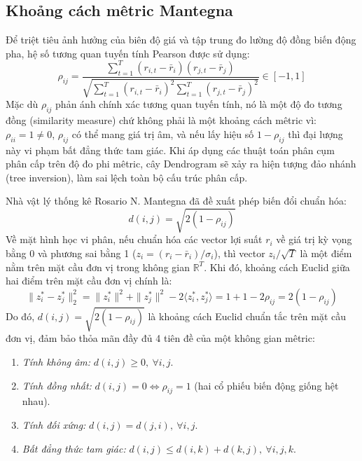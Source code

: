 \documentclass[12pt,a4paper,oneside,openany]{report}
\begin{document}
\subsection{Khoảng cách mêtric Mantegna}
Để triệt tiêu ảnh hưởng của biên độ giá và tập trung đo lường độ đồng biến động pha, hệ số tương quan tuyến tính Pearson được sử dụng:
\begin{equation}
  \rho_{ij} = \frac{\sum_{t=1}^T (r_{i, t} - \bar{r}_i)(r_{j, t} - \bar{r}_j)}{\sqrt{\sum_{t=1}^T (r_{i, t} - \bar{r}_i)^2 \sum_{t=1}^T (r_{j, t} - \bar{r}_j)^2}} \in [-1, 1]
\end{equation}
Mặc dù $\rho_{ij}$ phản ánh chính xác tương quan tuyến tính, nó là một độ đo tương đồng (similarity measure) chứ không phải là một khoảng cách mêtric vì: $\rho_{ii} = 1 \ne 0$, $\rho_{ij}$ có thể mang giá trị âm, và nếu lấy hiệu số $1 - \rho_{ij}$ thì đại lượng này vi phạm bất đẳng thức tam giác. Khi áp dụng các thuật toán phân cụm phân cấp trên độ đo phi mêtric, cây Dendrogram sẽ xảy ra hiện tượng đảo nhánh (tree inversion), làm sai lệch toàn bộ cấu trúc phân cấp.

Nhà vật lý thống kê Rosario N. Mantegna \cite{mantegna1999} đã đề xuất phép biến đổi chuẩn hóa:
\begin{equation}
  d(i, j) = \sqrt{2(1 - \rho_{ij})}
  \label{eq:mantegna}
\end{equation}
Về mặt hình học vi phân, nếu chuẩn hóa các vector lợi suất $r_i$ về giá trị kỳ vọng bằng 0 và phương sai bằng 1 ($z_i = (r_i - \bar{r}_i)/\sigma_i$), thì vector $z_i/\sqrt{T}$ là một điểm nằm trên mặt cầu đơn vị trong không gian $\mathbb{R}^T$. Khi đó, khoảng cách Euclid giữa hai điểm trên mặt cầu đơn vị chính là:
\begin{equation}
  \| z_i^* - z_j^* \|_2^2 = \|z_i^*\|^2 + \|z_j^*\|^2 - 2 \langle z_i^*, z_j^* \rangle = 1 + 1 - 2\rho_{ij} = 2(1 - \rho_{ij})
\end{equation}
Do đó, $d(i, j) = \sqrt{2(1 - \rho_{ij})}$ là khoảng cách Euclid chuẩn tắc trên mặt cầu đơn vị, đảm bảo thỏa mãn đầy đủ 4 tiên đề của một không gian mêtric:
\begin{enumerate}
  \item \textit{Tính không âm:} $d(i, j) \ge 0, \ \forall i, j$.
  \item \textit{Tính đồng nhất:} $d(i, j) = 0 \iff \rho_{ij} = 1$ (hai cổ phiếu biến động giống hệt nhau).
  \item \textit{Tính đối xứng:} $d(i, j) = d(j, i), \ \forall i, j$.
  \item \textit{Bất đẳng thức tam giác:} $d(i, j) \le d(i, k) + d(k, j), \ \forall i, j, k$.
\end{enumerate}
\end{document}
